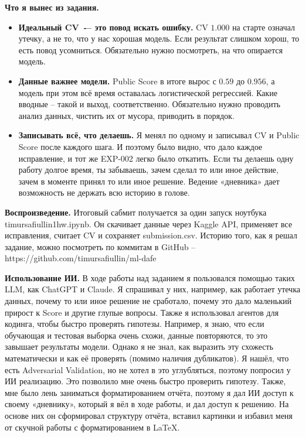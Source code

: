 \documentclass[11pt,a4paper,twocolumn]{article}
\newcommand{\f}[1]{{\ttfamily\def\_{\textunderscore\allowbreak}#1}}
\begin{document}
\textbf{Что я вынес из задания.}
\begin{itemize}
    \item \textbf{Идеальный CV~-– это повод искать ошибку.} CV $1.000$ на старте означал утечку, а не то, что у нас хорошая модель. Если результат слишком хорош, то есть повод усомниться. Обязательно нужно посмотреть, на что опирается модель.
    \item \textbf{Данные важнее модели.} Public Score в итоге вырос с $0.59$ до $0.956$, а модель при этом всё время оставалась логистической регрессией. Какие вводные – такой и выход, соответственно. Обязательно нужно проводить анализ данных, чистить их от мусора, приводить в порядок.
    \item \textbf{Записывать всё, что делаешь.} Я менял по одному и записывал CV и Public Score после каждого шага. И поэтому было видно, что дало каждое исправление, и тот же EXP-002 легко было откатить. Если ты делаешь одну работу долгое время, ты забываешь, зачем сделал то или иное действие, зачем в моменте принял то или иное решение. Ведение «дневника» дает возможность не держать всю историю в голове.
\end{itemize}

\medskip
\textbf{Воспроизведение.} Итоговый сабмит получается за один запуск ноутбука \mbox{\f{timur\_safiullin\_1hw.ipynb}}. Он скачивает данные через Kaggle API, применяет все исправления, считает CV и сохраняет \f{submission.csv}. Историю того, как я решал задание, можно посмотреть по коммитам в GitHub – https://github.com/timursafiullin/ml-dafe

\medskip
\textbf{Использование ИИ.} В ходе работы над заданием я пользовался помощью таких LLM, как ChatGPT и Claude. Я спрашивал у них, например, как работает утечка данных, почему то или иное решение не сработало, почему это дало маленький прирост к Score и другие глупые вопросы. Также я использовал агентов для кодинга, чтобы быстро проверять гипотезы. Например, я знаю, что если обучающая и тестовая выборка очень схожи, данные повторяются, то это завышает результаты модели. Однако я не знал, как выразить эту схожесть математически и как её проверять (помимо наличия дубликатов). Я нашёл, что есть Adversarial Validation, но не хотел в это углубляться, поэтому попросил у ИИ реализацию. Это позволило мне очень быстро проверить гипотезу. Также, мне было лень заниматься форматированием отчёта, поэтому я дал ИИ доступ к своему «дневнику», который я вёл в ходе работы, и дал доступ к решению. На основе них он сформировал структуру отчёта, вставил картинки и избавил меня от скучной работы с форматированием в LaTeX.
\end{document}

